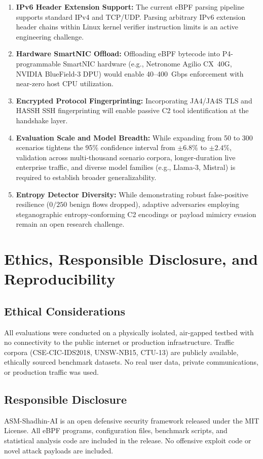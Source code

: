 \documentclass{ieeeaccess}
\renewcommand{\_}{\textunderscore\allowbreak}
\begin{document}
\begin{enumerate}
  \item \textbf{IPv6 Header Extension Support:} The current eBPF parsing pipeline supports standard
  IPv4 and TCP/UDP. Parsing arbitrary IPv6 extension header chains within Linux kernel verifier
  instruction limits is an active engineering challenge.
  \item \textbf{Hardware SmartNIC Offload:} Offloading eBPF bytecode into P4-programmable SmartNIC
  hardware (e.g., Netronome Agilio CX~40G, NVIDIA BlueField-3 DPU) would enable 40--400~Gbps
  enforcement with near-zero host CPU utilization.
  \item \textbf{Encrypted Protocol Fingerprinting:} Incorporating JA4/JA4S TLS and HASSH SSH
  fingerprinting will enable passive C2 tool identification at the handshake layer.
  \item \textbf{Evaluation Scale and Model Breadth:} While expanding from 50 to 300 scenarios
  tightens the 95\% confidence interval from $\pm 6.8\%$ to $\pm 2.4\%$, validation across
  multi-thousand scenario corpora, longer-duration live enterprise traffic, and diverse model
  families (e.g., Llama-3, Mistral) is required to establish broader generalizability.
  \item \textbf{Entropy Detector Diversity:} While demonstrating robust false-positive resilience
  ($0/250$ benign flows dropped), adaptive adversaries employing steganographic entropy-conforming
  C2 encodings or payload mimicry evasion remain an open research challenge.
\end{enumerate}

\section{Ethics, Responsible Disclosure, and Reproducibility}
\subsection{Ethical Considerations}
All evaluations were conducted on a physically isolated, air-gapped testbed with no
connectivity to the public internet or production infrastructure. Traffic corpora
(CSE-CIC-IDS2018, UNSW-NB15, CTU-13) are publicly available, ethically sourced
benchmark datasets. No real user data, private communications, or production traffic
was used.

\subsection{Responsible Disclosure}
ASM-Shadhin-AI is an open defensive security framework released under the MIT
License. All eBPF programs, configuration files, benchmark scripts, and statistical
analysis code are included in the release. No offensive exploit code or novel attack
payloads are included.
\end{document}
